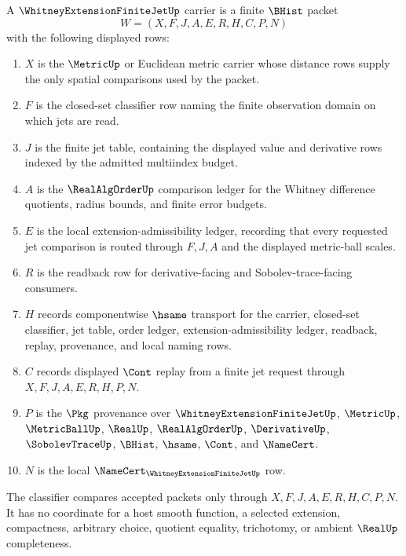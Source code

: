 \begin{definition}
\label{def:whitney-extension-finite-jet-carrier}
A $\WhitneyExtensionFiniteJetUp$ carrier is a finite $\BHist$ packet
$$
W=(X,F,J,A,E,R,H,C,P,N)
$$
with the following displayed rows:
\begin{enumerate}
\item $X$ is the $\MetricUp$ or Euclidean metric carrier whose distance rows supply the only spatial comparisons used by the packet.
\item $F$ is the closed-set classifier row naming the finite observation domain on which jets are read.
\item $J$ is the finite jet table, containing the displayed value and derivative rows indexed by the admitted multiindex budget.
\item $A$ is the $\RealAlgOrderUp$ comparison ledger for the Whitney difference quotients, radius bounds, and finite error budgets.
\item $E$ is the local extension-admissibility ledger, recording that every requested jet comparison is routed through $F,J,A$ and the displayed metric-ball scales.
\item $R$ is the readback row for derivative-facing and Sobolev-trace-facing consumers.
\item $H$ records componentwise $\hsame$ transport for the carrier, closed-set classifier, jet table, order ledger, extension-admissibility ledger, readback, replay, provenance, and local naming rows.
\item $C$ records displayed $\Cont$ replay from a finite jet request through $X,F,J,A,E,R,H,P,N$.
\item $P$ is the $\Pkg$ provenance over $\WhitneyExtensionFiniteJetUp$, $\MetricUp$, $\MetricBallUp$, $\RealUp$, $\RealAlgOrderUp$, $\DerivativeUp$, $\SobolevTraceUp$, $\BHist$, $\hsame$, $\Cont$, and $\NameCert$.
\item $N$ is the local $\NameCert_{\WhitneyExtensionFiniteJetUp}$ row.
\end{enumerate}
The classifier compares accepted packets only through $X,F,J,A,E,R,H,C,P,N$. It has no coordinate for a host smooth function, a selected extension, compactness, arbitrary choice, quotient equality, trichotomy, or ambient $\RealUp$ completeness.
\end{definition}

